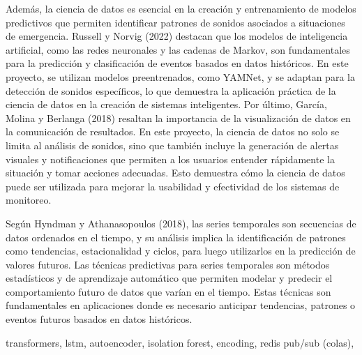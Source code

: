 Además, la ciencia de datos es esencial en la creación y entrenamiento de modelos predictivos que permiten identificar patrones de sonidos asociados a situaciones de emergencia. Russell y Norvig (2022) destacan que los modelos de inteligencia artificial, como las redes neuronales y las cadenas de Markov, son fundamentales para la predicción y clasificación de eventos basados en datos históricos. En este proyecto, se utilizan modelos preentrenados, como YAMNet, y se adaptan para la detección de sonidos específicos, lo que demuestra la aplicación práctica de la ciencia de datos en la creación de sistemas inteligentes. Por último, García, Molina y Berlanga (2018) resaltan la importancia de la visualización de datos en la comunicación de resultados. En este proyecto, la ciencia de datos no solo se limita al análisis de sonidos, sino que también incluye la generación de alertas visuales y notificaciones que permiten a los usuarios entender rápidamente la situación y tomar acciones adecuadas. Esto demuestra cómo la ciencia de datos puede ser utilizada para mejorar la usabilidad y efectividad de los sistemas de monitoreo.


Según Hyndman y Athanasopoulos (2018), las series temporales son secuencias de datos ordenados en el tiempo, y su análisis implica la identificación de patrones como tendencias, estacionalidad y ciclos, para luego utilizarlos en la predicción de valores futuros. Las técnicas predictivas para series temporales son métodos estadísticos y de aprendizaje automático que permiten modelar y predecir el comportamiento futuro de datos que varían en el tiempo. Estas técnicas son fundamentales en aplicaciones donde es necesario anticipar tendencias, patrones o eventos futuros basados en datos históricos.

transformers, lstm, autoencoder, isolation forest, encoding, redis pub/sub (colas),
